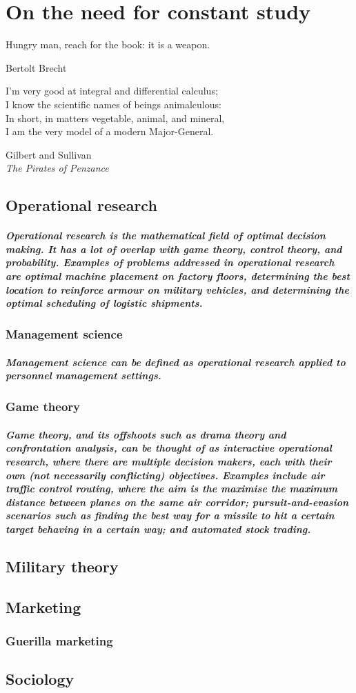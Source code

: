   \chapter{On the need for constant study}
    \epigraph{Hungry man, reach for the book: it is a weapon.}{Bertolt Brecht}
    \epigraph{I'm very good at integral and differential calculus;\\
  I know the scientific names of beings animalculous:\\
  In short, in matters vegetable, animal, and mineral,\\
  I am the very model of a modern Major-General.}{Gilbert and Sullivan \\ \textit{The Pirates of Penzance}}
    \section{Operational research}
	  \paragraph{Operational research is the mathematical field of optimal decision making. It has a lot of overlap with game theory, control theory, and probability. Examples of problems addressed in operational research are optimal machine placement on factory floors, determining the best location to reinforce armour on military vehicles, and determining the optimal scheduling of logistic shipments.}
    \subsection{Management science}
    	\paragraph{Management science can be defined as operational research applied to personnel management settings.}
    \subsection{Game theory}
    	\paragraph{Game theory, and its offshoots such as drama theory and confrontation analysis, can be thought of as \textit{interactive} operational research, where there are multiple decision makers, each with their own (not necessarily conflicting) objectives. Examples include air traffic control routing, where the aim is the maximise the maximum distance between planes on the same air corridor; pursuit-and-evasion scenarios such as finding the best way for a missile to hit a certain target behaving in a certain way; and automated stock trading.}
    \section{Military theory}

    \section{Marketing}
      \subsection{Guerilla marketing}
    \section{Sociology}